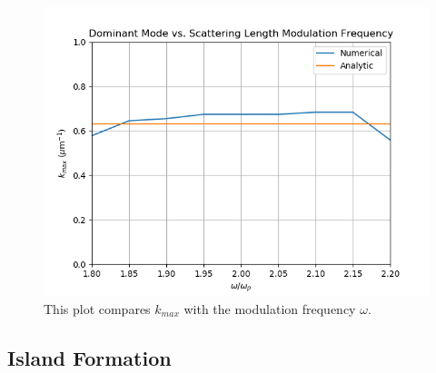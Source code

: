 \documentclass[12]{article}
\begin{document}
\begin{figure}[b]
\centering
\includegraphics[scale=0.9]{kmaxExpUnits}
\caption{This plot compares $k_{max}$ with the modulation frequency $\omega$.}
\label{fig:kmaxExp}
\end{figure}


\subsection{Island Formation}
\end{document}

